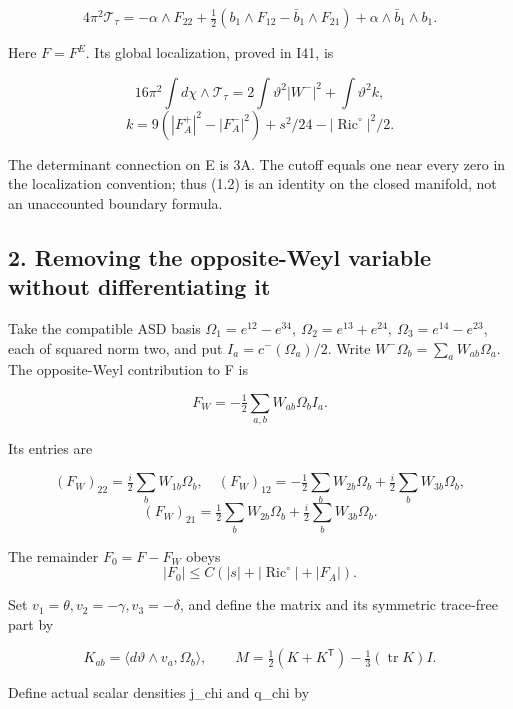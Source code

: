 \documentclass[
  10pt,
]{article}
\begin{document}
\[
 4\pi^2\mathcal T_\tau
 =-\alpha\wedge F_{22}
 +\tfrac12(b_1\wedge F_{12}-\bar b_1\wedge F_{21})
                         +\alpha\wedge\bar b_1\wedge b_1.
                                                               \tag{1.1}
\]

Here \(F=F^E\). Its global localization, proved in I41, is

\[
 16\pi^2\int d\chi\wedge\mathcal T_\tau
           =2\int\vartheta^2|W^-|^2+\int\vartheta^2 k,
                                                               \tag{1.2}
\] \[
 k=9(|F_A^+|^2-|F_A^-|^2)+s^2/24-|\operatorname{Ric}^{\circ}|^2/2.
\]

The determinant connection on E is 3A. The cutoff equals one near every
zero in the localization convention; thus (1.2) is an identity on the
closed manifold, not an unaccounted boundary formula.

\hypertarget{removing-the-opposite-weyl-variable-without-differentiating-it}{%
\subsection{2. Removing the opposite-Weyl variable without
differentiating
it}\label{removing-the-opposite-weyl-variable-without-differentiating-it}}

Take the compatible ASD basis \(\Omega_1=e^{12}-e^{34},\
\Omega_2=e^{13}+e^{24},\
\Omega_3=e^{14}-e^{23}\), each of squared norm two, and put
\(I_a=c^-(\Omega_a)/2\). Write \(W^-\Omega_b=\sum_a W_{ab}\Omega_a\).
The opposite-Weyl contribution to F is

\[
 F_W=-\tfrac12\sum_{a,b}W_{ab}\Omega_b I_a.
\]

Its entries are

\[
 (F_W)_{22}=\tfrac i2\sum_bW_{1b}\Omega_b,\quad
 (F_W)_{12}=-\tfrac12\sum_bW_{2b}\Omega_b
                         +\tfrac i2\sum_bW_{3b}\Omega_b,
\] \[
 (F_W)_{21}=\tfrac12\sum_bW_{2b}\Omega_b
                         +\tfrac i2\sum_bW_{3b}\Omega_b.
\]

The remainder \(F_0=F-F_W\) obeys \[
 |F_0|\le C(|s|+|\operatorname{Ric}^{\circ}|+|F_A|).
\]

Set \(v_1=\theta,v_2=-\gamma,v_3=-\delta\), and define the matrix and
its symmetric trace-free part by

\[
 K_{ab}=\langle d\vartheta\wedge v_a,\Omega_b\rangle,\qquad
 M=\tfrac12(K+K^{\mathsf T})-\tfrac13(\operatorname{tr}K)I.
\]

Define actual scalar densities j\_chi and q\_chi by
\end{document}
